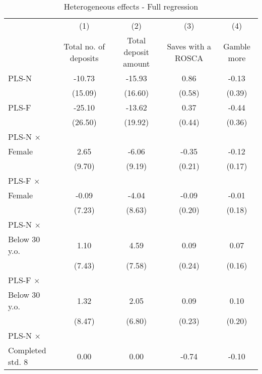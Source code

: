 \begin{table}[htbp]\centering
\def\sym#1{\ifmmode^{#1}\else\(^{#1}\)\fi}
\caption{Heterogeneous effects - Full regression}
\begin{tabular}{l*{4}{c}}
\toprule
                &\multicolumn{1}{c}{(1)}&\multicolumn{1}{c}{(2)}&\multicolumn{1}{c}{(3)}&\multicolumn{1}{c}{(4)}\\
                &\multicolumn{1}{c}{Total no. of deposits}&\multicolumn{1}{c}{Total deposit amount}&\multicolumn{1}{c}{Saves with a ROSCA}&\multicolumn{1}{c}{Gamble more}\\
\midrule
PLS-N           &   -10.73         &   -15.93         &     0.86         &    -0.13         \\
                &  (15.09)         &  (16.60)         &   (0.58)         &   (0.39)         \\
\addlinespace
PLS-F           &   -25.10         &   -13.62         &     0.37         &    -0.44         \\
                &  (26.50)         &  (19.92)         &   (0.44)         &   (0.36)         \\
\addlinespace
PLS-N $\times$ \\ Female&     2.65         &    -6.06         &    -0.35         &    -0.12         \\
                &   (9.70)         &   (9.19)         &   (0.21)         &   (0.17)         \\
\addlinespace
PLS-F $\times$ \\ Female&    -0.09         &    -4.04         &    -0.09         &    -0.01         \\
                &   (7.23)         &   (8.63)         &   (0.20)         &   (0.18)         \\
\addlinespace
PLS-N $\times$ \\ Below 30 y.o.&     1.10         &     4.59         &     0.09         &     0.07         \\
                &   (7.43)         &   (7.58)         &   (0.24)         &   (0.16)         \\
\addlinespace
PLS-F $\times$ \\ Below 30 y.o.&     1.32         &     2.05         &     0.09         &     0.10         \\
                &   (8.47)         &   (6.80)         &   (0.23)         &   (0.20)         \\
\addlinespace
PLS-N $\times$ \\ Completed std. 8&     0.00         &     0.00         &    -0.74         &    -0.10         \\

\end{tabular}
\end{table}
